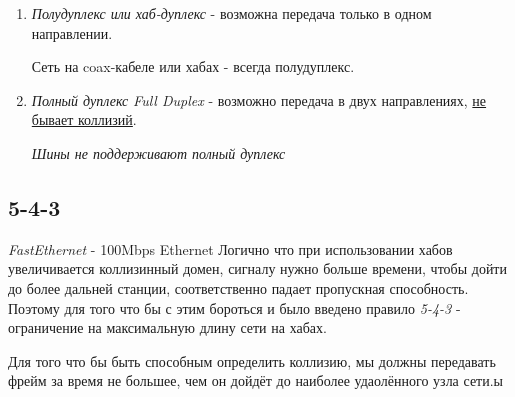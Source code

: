 \documentclass[a4paper,10pt]{article}
\begin{document}
	\begin{enumerate}
		\item \emph{Полудуплекс или хаб-дуплекс} - возможна передача только в одном направлении.
		
		Сеть на coax-кабеле или хабах - всегда полудуплекс.
		
		\item \emph{Полный дуплекс Full Duplex} - возможно передача в двух направлениях, \underline{не бывает коллизий}.
		
		\textit{Шины не поддерживают полный дуплекс}
		
	\end{enumerate}
	
	\subsection{5-4-3}
	\emph{FastEthernet} - 100Mbps Ethernet
	Логично что при использовании хабов увеличивается коллизинный домен, сигналу нужно больше времени, чтобы дойти до более дальней станции, соответственно падает пропускная способность. Поэтому для того что бы с этим бороться и было введено правило \emph{5-4-3} - ограничение на максимальную длину сети на хабах.
	
	Для того что бы быть способным определить коллизию, мы должны передавать фрейм за время не большее, чем он дойдёт до наиболее удаолённого узла сети.ы
	
\end{document}
